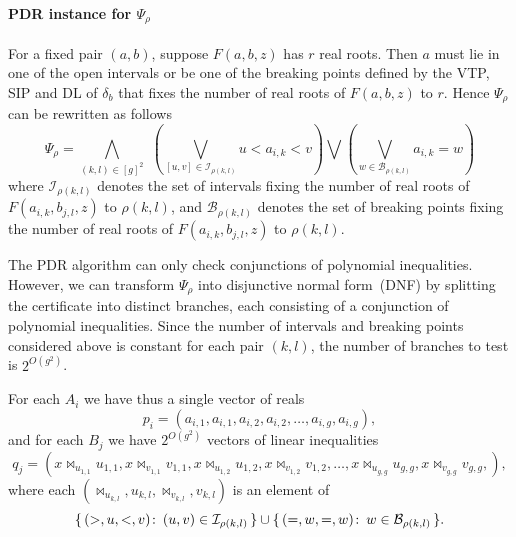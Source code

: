 \paragraph{PDR instance for $\Psi_\rho$}
For a fixed pair $(a,b)$, suppose $F(a,b,z)$ has $r$ real roots. Then $a$ must
lie in one of the open intervals or be one of the breaking points defined by
the VTP, SIP and DL of $\delta_b$ that fixes the number of real roots of
$F(a,b,z)$ to $r$.
Hence $\Psi_\rho$ can be rewritten as follows
\begin{displaymath}
	\Psi_{\rho} =
	\bigwedge_{(k,l)\in{[g]}^2}\,\,
	\left(\bigvee_{[u,v]\in \mathcal{I}_{\rho(k,l)}} u < a_{i,k} < v\right)
	\bigvee
	\left(\bigvee_{w\in \mathcal{B}_{\rho(k,l)}} a_{i,k} = w\right)
\end{displaymath}
where $\mathcal{I}_{\rho(k,l)}$ denotes the set of intervals fixing the number
of real roots of $F(a_{i,k},b_{j,l},z)$ to $\rho(k,l)$, and
$\mathcal{B}_{\rho(k,l)}$ denotes the set of breaking points fixing the number
of real roots of $F(a_{i,k},b_{j,l},z)$ to $\rho(k,l)$.

The PDR algorithm can only check conjunctions of polynomial inequalities.
However, we can transform $\Psi_{\rho}$ into disjunctive normal form~(DNF) by
splitting the certificate into distinct branches, each consisting of a
conjunction of polynomial inequalities.
Since the number of intervals and breaking points
considered above is constant for each pair $(k,l)$, the number of branches to
test is $2^{O(g^2)}$.

For each $A_i$ we have thus a single vector of reals
\begin{displaymath}
	p_i = (
		a_{i,1} , a_{i,1},
		a_{i,2}, a_{i,2},
		\ldots,
		a_{i,g} , a_{i,g}
	),
\end{displaymath}
and for each $B_j$ we have $2^{O(g^2)}$ vectors of linear inequalities
\begin{displaymath}
	q_j = (
		x \bowtie_{u_{1,1}} u_{1,1}, x \bowtie_{v_{1,1}} v_{1,1},
		x \bowtie_{u_{1,2}} u_{1,2}, x \bowtie_{v_{1,2}} v_{1,2},
		\ldots,
		x \bowtie_{u_{g,g}} u_{g,g}, x \bowtie_{v_{g,g}} v_{g,g},
	),
\end{displaymath}
where each $(\bowtie_{u_{k,l}}, u_{k,l}, \bowtie_{v_{k,l}}, v_{k,l})$ is an element of
\begin{displaymath}
	\{\, ( > , u , < , v ) \colon\, (u,v) \in \mathcal{I}_{\rho(k,l)}\,\}
	\cup
	\{\, ( = , w , = , w ) \colon\, w \in \mathcal{B}_{\rho(k,l)}\,\}.
\end{displaymath}

